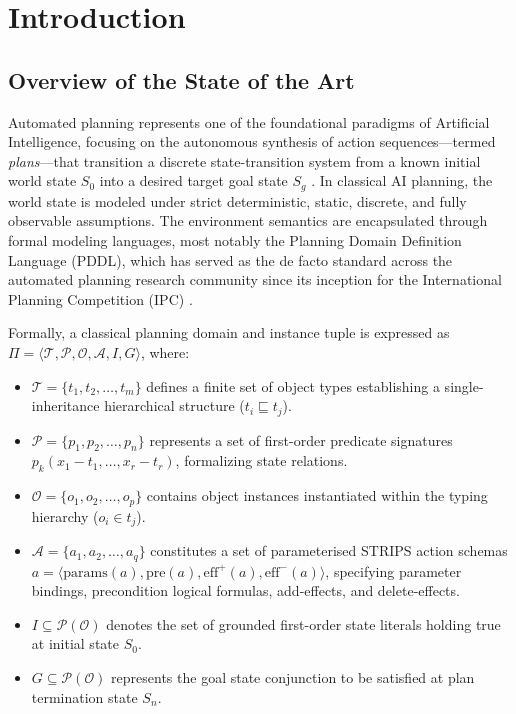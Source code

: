\documentclass[11pt,a4paper]{report}
\begin{document}
\tableofcontents
\newpage

\chapter{Introduction}

\section{Overview of the State of the Art}
Automated planning represents one of the foundational paradigms of Artificial Intelligence, focusing on the autonomous synthesis of action sequences—termed \textit{plans}—that transition a discrete state-transition system from a known initial world state $S_0$ into a desired target goal state $S_g$ \cite{ghallab2004}. In classical AI planning, the world state is modeled under strict deterministic, static, discrete, and fully observable assumptions. The environment semantics are encapsulated through formal modeling languages, most notably the Planning Domain Definition Language (PDDL), which has served as the de facto standard across the automated planning research community since its inception for the International Planning Competition (IPC) \cite{mcdermott1998}.

Formally, a classical planning domain and instance tuple is expressed as $\Pi = \langle \mathcal{T}, \mathcal{P}, \mathcal{O}, \mathcal{A}, I, G \rangle$, where:
\begin{itemize}
    \item $\mathcal{T} = \{t_1, t_2, \dots, t_m\}$ defines a finite set of object types establishing a single-inheritance hierarchical structure ($t_i \sqsubseteq t_j$).
    \item $\mathcal{P} = \{p_1, p_2, \dots, p_n\}$ represents a set of first-order predicate signatures $p_k(x_1 - t_1, \dots, x_r - t_r)$, formalizing state relations.
    \item $\mathcal{O} = \{o_1, o_2, \dots, o_p\}$ contains object instances instantiated within the typing hierarchy ($o_i \in t_j$).
    \item $\mathcal{A} = \{a_1, a_2, \dots, a_q\}$ constitutes a set of parameterised STRIPS action schemas $a = \langle \text{params}(a), \text{pre}(a), \text{eff}^+(a), \text{eff}^-(a) \rangle$, specifying parameter bindings, precondition logical formulas, add-effects, and delete-effects.
    \item $I \subseteq \mathcal{P}(\mathcal{O})$ denotes the set of grounded first-order state literals holding true at initial state $S_0$.
    \item $G \subseteq \mathcal{P}(\mathcal{O})$ represents the goal state conjunction to be satisfied at plan termination state $S_n$.
\end{itemize}
\end{document}

